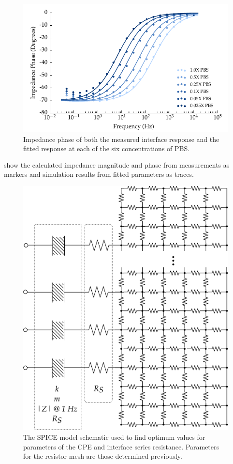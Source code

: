       \begin{figure}
        \centering
        \includegraphics{content/pt2/08-InterfaceParameters/graphics/displacement_impedanceVsFrequency_phase_thesis}
        \caption{\label{fig:pt2-graph_impedanceVsFrequency_phase}Impedance phase of both the measured interface response and the fitted response at each of the six concentrations of PBS.}
      \end{figure}
       show the calculated impedance magnitude and phase from measurements as markers and simulation results from fitted parameters as traces.
      \begin{figure}[ht]
        \centering
        \includegraphics{content/pt2/08-InterfaceParameters/graphics/SpiceModel_opitimisation}
        \caption{\label{fig:pt2-spiceModel_optimisation}The SPICE model schematic used to find optimum values for parameters of the CPE and interface series resistance. Parameters for the resistor mesh are those determined previously.}
      \end{figure}
